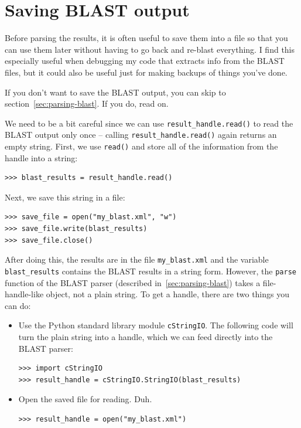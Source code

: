\documentclass{report}
\begin{document}
\section{Saving BLAST output}
\label{sec:saving-blast-output}

Before parsing the results, it is often useful to save them into a
file so that you can use them later without having to go back and
re-blast everything. I find this especially useful when debugging my
code that extracts info from the BLAST files, but it could also be
useful just for making backups of things you've done.

If you don't want to save the BLAST output, you can skip to
section~\ref{sec:parsing-blast}. If you do, read on.

We need to be a bit careful since we can use \verb|result_handle.read()| to
read the BLAST output only once -- calling \verb|result_handle.read()| again
returns an empty string. First, we use \verb|read()| and store all of
the information from the handle into a string:

\begin{verbatim}
>>> blast_results = result_handle.read()
\end{verbatim}

Next, we save this string in a file:

\begin{verbatim}
>>> save_file = open("my_blast.xml", "w")
>>> save_file.write(blast_results)
>>> save_file.close()
\end{verbatim}

After doing this, the results are in the file \verb|my_blast.xml| and the
variable \verb|blast_results| contains the BLAST results in a string
form. However, the \verb|parse| function of the BLAST parser (described
in~\ref{sec:parsing-blast}) takes a file-handle-like object, not a
plain string. To get a handle, there are two things you can do:
\begin{itemize}
\item Use the Python standard library module \verb|cStringIO|. The
following code will turn the plain string into a handle, which we can
feed directly into the BLAST parser:
\begin{verbatim}
>>> import cStringIO
>>> result_handle = cStringIO.StringIO(blast_results)
\end{verbatim}
\item Open the saved file for reading. Duh.
\begin{verbatim}
>>> result_handle = open("my_blast.xml")
\end{verbatim}
\end{itemize}
\end{document}
